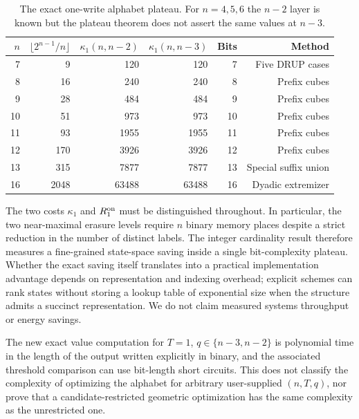 \documentclass[11pt,a4paper]{article}
\begin{document}
\begin{table}[ht]\centering\small
\begin{tabular}{@{}rrrrrr@{}}\toprule
$n$ & $\lfloor2^{n-1}/n\rfloor$ & $\kappa_1(n,n-2)$ & $\kappa_1(n,n-3)$ & Bits & Method\\\midrule
7&9&120&120&7&Five DRUP cases\\
8&16&240&240&8&Prefix cubes\\
9&28&484&484&9&Prefix cubes\\
10&51&973&973&10&Prefix cubes\\
11&93&1955&1955&11&Prefix cubes\\
12&170&3926&3926&12&Prefix cubes\\
13&315&7877&7877&13&Special suffix union\\
16&2048&63488&63488&16&Dyadic extremizer\\\bottomrule
\end{tabular}
\caption{The exact one-write alphabet plateau. For $n=4,5,6$ the $n-2$ layer is known but the plateau theorem does not assert the same values at $n-3$.}\label{tab:mergedvalues}
\end{table}





The two costs $\kappa_1$ and $R_1^{\rm on}$ must be distinguished throughout. In particular, the two near-maximal erasure levels require $n$ binary memory places despite a strict reduction in the number of distinct labels. The integer cardinality result therefore measures a fine-grained state-space saving inside a single bit-complexity plateau. Whether the exact saving itself translates into a practical implementation advantage depends on representation and indexing overhead; explicit schemes can rank states without storing a lookup table of exponential size when the structure admits a succinct representation. We do not claim measured systems throughput or energy savings.

The new exact value computation for $T=1$, $q\in\{n-3,n-2\}$ is polynomial time in the length of the output written explicitly in binary, and the associated threshold comparison can use bit-length short circuits. This does not classify the complexity of optimizing the alphabet for arbitrary user-supplied $(n,T,q)$, nor prove that a candidate-restricted geometric optimization has the same complexity as the unrestricted one.
\end{document}

